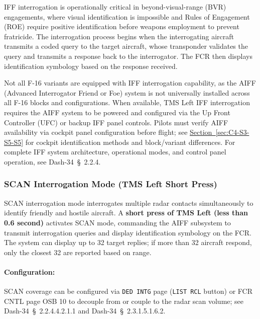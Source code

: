 \documentclass[11pt, a4paper, twoside]{report}
\newcommand{\dashref}[1]{Dash-34~\S~#1}
\newcommand{\secref}[1]{\hyperref[#1]{Section~\ref*{#1}}}
\begin{document}
IFF interrogation is operationally critical in beyond-visual-range (BVR) engagements, where visual identification is impossible and Rules of Engagement (ROE) require positive identification before weapons employment to prevent fratricide. The interrogation process begins when the interrogating aircraft transmits a coded query to the target aircraft, whose transponder validates the query and transmits a response back to the interrogator. The FCR then displays identification symbology based on the response received.

Not all F-16 variants are equipped with IFF interrogation capability, as the AIFF (Advanced Interrogator Friend or Foe) system is not universally installed across all F-16 blocks and configurations. When available, TMS Left IFF interrogation requires the AIFF system to be powered and configured via the Up Front Controller (UFC) or backup IFF panel controls. Pilots must verify AIFF availability via cockpit panel configuration before flight; see \secref{sec:C4-S3-S5-S5} for cockpit identification methods and block/variant differences. For complete IFF system architecture, operational modes, and control panel operation, see \dashref{2.2.4}.

\subsubsection{SCAN Interrogation Mode (TMS Left Short Press)}
\label{sec:C4-S3-S5-S1}

SCAN interrogation mode interrogates multiple radar contacts simultaneously to identify friendly and hostile aircraft. A \textbf{short press of TMS Left (less than 0.6 second)} activates SCAN mode, commanding the AIFF subsystem to transmit interrogation queries and display identification symbology on the FCR. The system can display up to 32 target replies; if more than 32 aircraft respond, only the closest 32 are reported based on range.

\paragraph{Configuration:} SCAN coverage can be configured via \texttt{DED INTG} page (\texttt{LIST RCL} button) or FCR CNTL page OSB 10 to decouple from or couple to the radar scan volume; see \dashref{2.2.4.4.2.1.1} and \dashref{2.3.1.5.1.6.2}.
\end{document}

